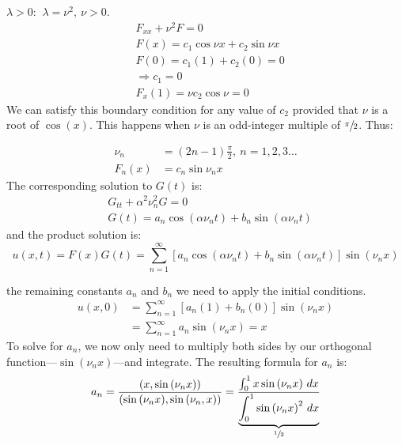 \vspace{0.25cm}

\noindent\underline{$\lambda > 0$}: $\ \lambda = \nu^2, \ \nu>0$.
\begin{align*}
&F_{xx} + \nu^2 F = 0 \\
&F(x) = c_1\cos{\nu x} + c_2 \sin{\nu x} \\
&F(0) = c_1(1) + c_2(0) = 0 \\
&\Rightarrow c_1 = 0 \\
&F_{x}(1) = \nu c_2 \cos{\nu} = 0
\end{align*}
We can satisfy this boundary condition for any value of $c_2$ provided that $\nu$ is a root of $\cos(x)$.  This happens when $\nu$ is an odd-integer multiple of $\sfrac{\pi}{2}$.  Thus:

\begin{align*}
\nu_n &= (2n-1)\frac{\pi}{2}, \ n=1,2,3\dots \\
F_n(x) &= c_n \sin{\nu_n x}
\end{align*} 
The corresponding solution to $G(t)$ is:
\begin{align*}
&G_{tt} + \alpha^2 \nu_n^2 G = 0 \\
&G(t) = a_n \cos{(\alpha \nu_n t)}+b_n\sin{(\alpha \nu_n t)}
\end{align*}
and the product solution is:
\begin{equation*}
u(x,t) = F(x)G(t) = \sum\limits_{n=1}^{\infty} \left[a_n \cos{(\alpha \nu_n t)}+b_n\sin{(\alpha \nu_n t)} \right]\sin{(\nu_n x)}
\end{equation*}

 the remaining constants $a_n$ and $b_n$ we need to apply the initial conditions.
\begin{align*}
u(x,0) &= \sum\limits_{n=1}^{\infty}\left[a_n(1) + b_n(0) \right]\sin{(\nu_n x)} \\
&=\sum\limits_{n=1}^{\infty} a_n \sin{(\nu_n x)} = x
\end{align*}
To solve for $a_n$, we now only need to multiply both sides by our orthogonal function---$\sin{(\nu_n x)}$---and integrate.  The resulting formula for $a_n$ is:
\begin{equation*}
a_n = \frac{(x,\sin{(\nu_n x)})}{(\sin{(\nu_nx)},\sin{(\nu_n,x)})} = \frac{\int_{0}^{1}x \sin{(\nu_n x)} \ dx}{\underbrace{\int_0^1 \sin{(\nu_n x)}^2 \ dx}_{\sfrac{1}{2}}}
\end{equation*}

